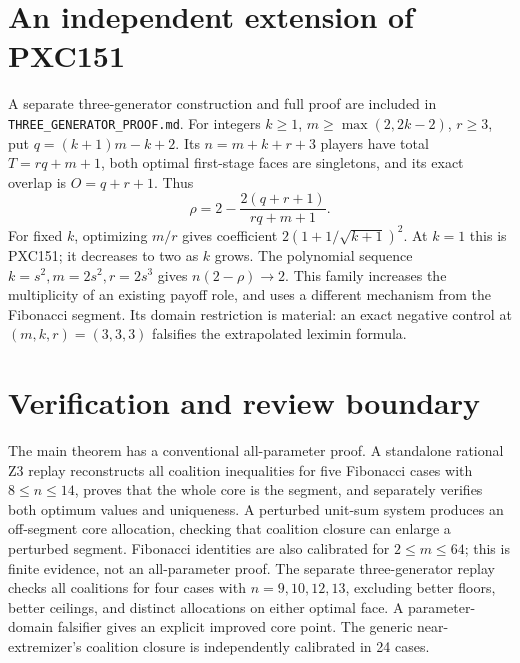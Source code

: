 \documentclass[11pt]{article}
\begin{document}
\section{An independent extension of PXC151}
A separate three-generator construction and full proof are included in
\texttt{THREE\_GENERATOR\_PROOF.md}. For integers $k\ge1$,
$m\ge\max(2,2k-2)$, $r\ge3$, put $q=(k+1)m-k+2$.
Its $n=m+k+r+3$ players have total $T=rq+m+1$, both optimal first-stage
faces are singletons, and its exact overlap is $O=q+r+1$. Thus
\[
 \rho=2-\frac{2(q+r+1)}{rq+m+1}.
\]
For fixed $k$, optimizing $m/r$ gives coefficient
$2(1+1/\sqrt{k+1})^2$. At $k=1$ this is PXC151; it decreases to two as
$k$ grows. The polynomial sequence $k=s^2,m=2s^2,r=2s^3$ gives
$n(2-\rho)\to2$. This family increases the multiplicity of an existing
payoff role, and uses a different mechanism from the Fibonacci segment.
Its domain restriction is material: an exact negative control at
$(m,k,r)=(3,3,3)$ falsifies the extrapolated leximin formula.

\section{Verification and review boundary}
The main theorem has a conventional all-parameter proof. A standalone
rational Z3 replay reconstructs all coalition inequalities for five
Fibonacci cases with $8\le n\le14$, proves that the whole core is the
segment, and separately verifies both optimum values and uniqueness.
A perturbed unit-sum system produces an off-segment core allocation,
checking that coalition closure can enlarge a perturbed segment. Fibonacci identities are also calibrated
for $2\le m\le64$; this is finite evidence, not an all-parameter proof.
The separate three-generator replay checks all coalitions for four cases
with $n=9,10,12,13$, excluding better floors, better ceilings, and distinct
allocations on either optimal face. A parameter-domain falsifier gives
an explicit improved core point. The generic near-extremizer's coalition
closure is independently calibrated in 24 cases.
\end{document}
